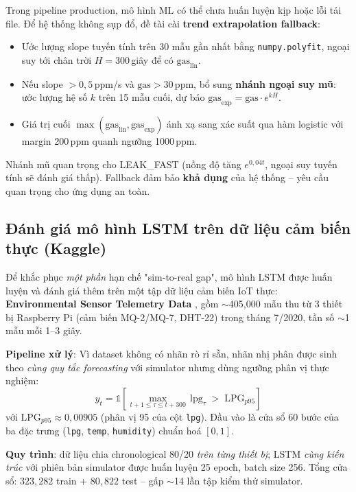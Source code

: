 Trong pipeline production, mô hình ML có thể chưa huấn luyện kịp hoặc lỗi tải file. Để hệ thống không sụp đổ, đề tài cài \textbf{trend extrapolation fallback}:
\begin{itemize}
  \item Ước lượng slope tuyến tính trên 30 mẫu gần nhất bằng \texttt{numpy.polyfit}, ngoại suy tới chân trời $H = 300$\,giây để có $\text{gas}_{\text{lin}}$.
  \item Nếu slope $> 0{,}5$\,ppm/s và $\text{gas} > 30$\,ppm, bổ sung \textbf{nhánh ngoại suy mũ}: ước lượng hệ số $k$ trên 15 mẫu cuối, dự báo $\text{gas}_{\text{exp}} = \text{gas} \cdot e^{k H}$.
  \item Giá trị cuối $\max(\text{gas}_{\text{lin}}, \text{gas}_{\text{exp}})$ ánh xạ sang xác suất qua hàm logistic với margin 200\,ppm quanh ngưỡng 1000\,ppm.
\end{itemize}
Nhánh mũ quan trọng cho LEAK\_FAST (nồng độ tăng $e^{0{,}04 t}$, ngoại suy tuyến tính sẽ đánh giá thấp). Fallback đảm bảo \textbf{khả dụng} của hệ thống -- yêu cầu quan trọng cho ứng dụng an toàn.

\subsection{Đánh giá mô hình LSTM trên dữ liệu cảm biến thực (Kaggle)}
\label{ssec:lstm_kaggle}

Để khắc phục \emph{một phần} hạn chế "sim-to-real gap", mô hình LSTM được huấn luyện và đánh giá thêm trên một tập dữ liệu cảm biến IoT thực: \textbf{Environmental Sensor Telemetry Data} \cite{stafford2020envsensor}, gồm $\sim$405{,}000 mẫu thu từ 3 thiết bị Raspberry Pi (cảm biến MQ-2/MQ-7, DHT-22) trong tháng 7/2020, tần số $\sim$1 mẫu mỗi 1--3 giây.

\textbf{Pipeline xử lý}: Vì dataset không có nhãn rò rỉ sẵn, nhãn nhị phân được sinh theo \emph{cùng quy tắc forecasting} với simulator nhưng dùng ngưỡng phân vị thực nghiệm:
\[
  y_t = \mathbb{1}\!\left[\max_{t+1\le \tau\le t+300}\, \text{lpg}_\tau \;>\; \text{LPG}_{p95}\right]
\]
với $\text{LPG}_{p95} \approx 0{,}00905$ (phân vị 95 của cột \texttt{lpg}). Đầu vào là cửa sổ 60 bước của ba đặc trưng (\texttt{lpg}, \texttt{temp}, \texttt{humidity}) chuẩn hoá $[0,1]$.

\textbf{Quy trình}: dữ liệu chia chronological 80/20 \emph{trên từng thiết bị}; LSTM \emph{cùng kiến trúc} với phiên bản simulator được huấn luyện 25 epoch, batch size 256. Tổng cửa sổ: $323{,}282$ train + $80{,}822$ test -- gấp $\sim$14 lần tập kiểm thử simulator.

